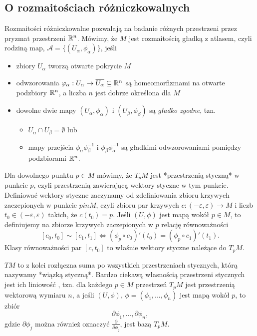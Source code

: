 \subsection{O rozmaitościach różniczkowalnych}

Rozmaitości różniczkowalne pozwalają na badanie różnych przestrzeni przez pryzmat przestrzeni $\mathbb{R}^n$. Mówimy, że $M$ jest rozmaitością gładką z atlasem, czyli rodziną map, $\mathcal{A}=\{ (U_\alpha, \phi_\alpha) \}$, jeśli
\begin{itemize}
  \item zbiory $U_\alpha$ tworzą otwarte pokrycie $M$
  \item odwzorowania $\varphi_\alpha:U_\alpha \to \overline{U_\alpha} \subseteq \mathbb{R}^n$ są homeomorfizmami na otwarte podzbiory $\mathbb{R}^n$, a liczba $n$ jest dobrze określona dla $M$
  \item dowolne dwie mapy $(U_\alpha, \phi_\alpha)$ i $(U_\beta, \phi_\beta)$ są \emph{gładko zgodne}, tzn.
    \begin{itemize}
      \item $U_\alpha \cap U_\beta=\emptyset$ lub
      \item mapy przejścia $\phi_\alpha \phi_\beta^{-1}$ i $\phi_\beta \phi_\alpha^{-1}$ są gładkimi odwzorowaniami pomiędzy podzbiorami $\mathbb{R}^n$.
    \end{itemize}
\end{itemize}

Dla dowolnego punktu $p \in M$ mówimy, że $T_p M$ jest *przestrzenią styczną* w punkcie $p$, czyli przestrzenią zawierającą wektory styczne w tym punkcie. Definiować wektory styczne zaczynamy od zdefiniowania zbioru krzywych zaczepionych w punkcie $p in M$, czyli zbioru par krzywych $c: (-\varepsilon, \varepsilon) \to M$ i liczb $t_0 \in (-\varepsilon, \varepsilon)$ takich, że $c(t_0)=p$. Jeśli $(U, \phi)$ jest mapą wokół $p \in M$, to definiujemy na zbiorze krzywych zaczepionych w $p$ relację równoważności 
$$ [c_0, t_0] \sim [c_1, t_1] \iff (\phi_p \circ  c_0)'(t_0)=(\phi_p \circ  c_1)'(t_1). $$
Klasy równoważności par $[c, t_0]$ to właśnie wektory styczne należące do $T_p M$.


$T M$ to z kolei rozłączna suma po wszystkich przestrzeniach stycznych, którą nazywamy *wiązką styczną*. Bardzo ciekawą własnością przestrzeni stycznych jest ich liniowość \cite{leeSmoothManifolds}, tzn. dla każdego $p \in M$ przestrzeń $T_p M$ jest przestrzenią wektorową wymiaru $n$, a jeśli $(U, \phi)$, $\phi=(\phi_1,...,\phi_n)$ jest mapą wokół $p$, to zbiór
$$ { \partial \phi_1,..., \partial \phi_n }, $$
gdzie $\partial \phi_j$ można również oznaczyć $\frac{\partial}{\partial \phi_j}$, jest bazą $T_p M$.
